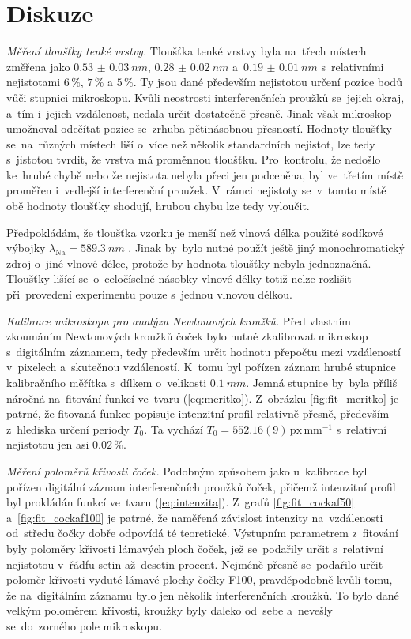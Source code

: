 \documentclass{../concepts/titul_protokol_p/prepareprotokol} %
\begin{document}
\section{Diskuze}

\textit{Měření tloušťky tenké vrstvy.}
Tloušťka tenké vrstvy byla na~třech místech změřena jako $\qty{0.53(3)}{nm}$, $\qty{0.28(2)}{nm}$
a~$\qty{0.19(1)}{nm}$ s~relativními nejistotami $6\,\%$, $7\,\%$ a $5\,\%$. Ty jsou dané především nejistotou
určení pozice bodů vůči stupnici mikroskopu. Kvůli neostrosti interferenčních proužků se~jejich okraj,
a~tím i~jejich vzdálenost, nedala určit dostatečně přesně. Jinak však mikroskop umožnoval odečítat pozice
se~zrhuba pětinásobnou přesností. Hodnoty tloušťky se~na~různých místech liší o~více než několik standardních
nejistot, lze tedy s~jistotou tvrdit, že vrstva má proměnnou tloušťku. Pro~kontrolu, že nedošlo ke~hrubé chybě
nebo že nejistota nebyla přeci jen podceněna, byl ve~třetím místě proměřen i~vedlejší interferenční proužek.
V~rámci nejistoty se~v~tomto místě obě hodnoty tloušťky shodují, hrubou chybu lze tedy vyloučit.

Předpokládám, že tloušťka vzorku je menší než vlnová délka použité sodíkové výbojky 
$\lambda_\mathrm{Na} = \qty{589.3}{nm}$ \cite{vlnovedelky}. Jinak by~bylo nutné použít ještě jiný
monochromatický zdroj o~jiné vlnové délce, protože by hodnota tloušťky nebyla jednoznačná. Tloušťky lišící
se~o~celočíselné násobky vlnové délky totiž nelze rozlišit při~provedení experimentu pouze s~jednou
vlnovou délkou.

\textit{Kalibrace mikroskopu pro analýzu Newtonových kroužků.}
Před vlastním zkoumáním Newtonových kroužků čoček bylo nutné zkalibrovat mikroskop s~digitálním záznamem, tedy
především určit hodnotu přepočtu mezi vzdáleností v~pixelech a~skutečnou vzdáleností. K~tomu byl pořízen
záznam hrubé stupnice kalibračního měřítka s~dílkem o~velikosti $\qty{0.1}{mm}$. Jemná stupnice by~byla příliš
náročná na~fitování funkcí ve~tvaru (\ref{eq:meritko}). Z~obrázku \ref{fig:fit_meritko} je patrné, že fitovaná
funkce popisuje intenzitní profil relativně přesně, především z~hlediska určení periody $T_0$. Ta vychází
$T_0 = 552.16(9) \, \mathrm{px \, mm^{-1}}$ s~relativní nejistotou jen asi $0.02\,\%$.

\textit{Měření poloměrů křivosti čoček.}
Podobným způsobem jako u~kalibrace byl pořízen digitální záznam interferenčních proužků čoček, přičemž
intenzitní profil byl prokládán funkcí ve~tvaru (\ref{eq:intenzita}). Z~grafů \ref{fig:fit_cockaf50}
a~\ref{fig:fit_cockaf100} je patrné, že naměřená závislost intenzity na~vzdálenosti od~středu čočky
dobře odpovídá té teoretické. Výstupním parametrem z~fitování byly poloměry křivosti lámavých ploch čoček,
jež se~podařily určit s~relativní nejistotou v~řádfu setin až~desetin procent. Nejméně přesně se~podařilo
určit poloměr křivosti vyduté lámavé plochy čočky F100, pravděpodobně kvůli tomu, že na~digitálním záznamu
bylo jen několik interferenčních kroužků. To bylo dané velkým poloměrem křivosti, kroužky byly daleko
od~sebe a~nevešly se~do~zorného pole mikroskopu.
\end{document}
